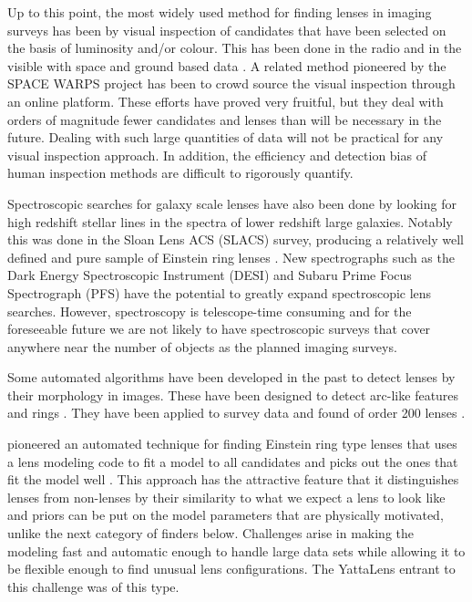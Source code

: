 \documentclass{aa}
\begin{document}
Up to this point, the most widely used method for finding lenses in imaging surveys has been by visual inspection of candidates that have been selected on the basis of luminosity and/or colour.  This has been done in the radio \citep{2003MNRAS.341...13B} and in the visible with space and ground based data \citep{2008MNRAS.389.1311J,2008ApJS..176...19F,2010AandA...517A..25S,2014MNRAS.439.3392P}.  A related method pioneered by the SPACE WARPS project \citep{2016MNRAS.455.1171M,2016MNRAS.455.1191M,2015MNRAS.452..502G} has been to crowd source the visual inspection through an online platform.  These efforts have proved very fruitful, but they deal with orders of magnitude fewer candidates and lenses than will be necessary in the future.  Dealing with such large quantities of data will not be practical for any visual inspection approach.  In addition, the efficiency and detection bias of human inspection methods are difficult to rigorously quantify.

Spectroscopic searches for galaxy scale lenses have also been done by looking for high redshift stellar lines in the spectra of lower redshift large galaxies.  Notably this was done in the Sloan Lens ACS (SLACS) survey, producing a relatively well defined and pure sample of Einstein ring lenses \citep{2006MNRAS.369.1521W,2006ApJ...638..703B,2012ApJ...744...41B,2015MNRAS.449.3441S}.  
New spectrographs such as the Dark Energy Spectroscopic Instrument  (DESI) \citep{2016arXiv161100036D} and Subaru Prime Focus Spectrograph (PFS) \citep{2016SPIE.9908E..1MT} have the potential to greatly expand spectroscopic lens searches.
However, spectroscopy is telescope-time consuming and for the foreseeable future we are not likely to have spectroscopic surveys that cover anywhere near the number of objects as the planned imaging surveys.

Some automated algorithms have been developed in the past to detect lenses by their morphology in images.  These have been designed to detect arc-like 
features \citep{2006astro.ph..6757A,2007AandA...472..341S, 2017AandA...597A.135B} and rings 
\citep{2014ApJ...785..144G,2014AandA...566A..63J}.  They have been applied to survey data and found of order 200 lenses \citep{2007AandA...461..813C,2012ApJ...749...38M,2016AandA...592A..75P}.  

\cite{2009ApJ...694..924M} pioneered an automated technique for finding Einstein ring type lenses that uses a lens modeling code to fit a model to all candidates and picks out the ones that fit the model well \citep[see also][]{2017arXiv170401585S}.   This approach has the attractive feature that it distinguishes lenses from non-lenses by their similarity to what we expect a lens to look like and priors can be put on the model parameters that are physically motivated, unlike the next category of finders below.  Challenges arise in making the modeling fast and automatic enough to handle large 
data sets while allowing it to be flexible enough to find unusual lens configurations.  The YattaLens entrant to this challenge was of this type.
\end{document}
